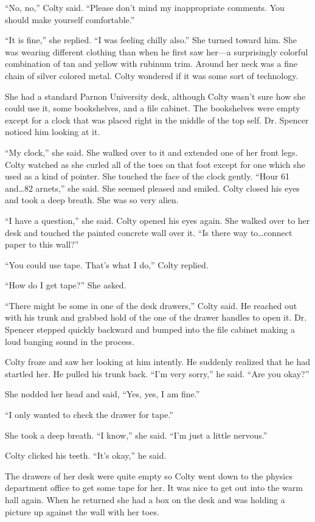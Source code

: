 ``No, no,'' Colty said. ``Please don't mind my inappropriate comments. You should make yourself
comfortable.''

``It is fine,'' she replied. ``I was feeling chilly also.'' She turned toward him. She was
wearing different clothing than when he first saw her---a surprisingly colorful combination of
tan and yellow with rubinum trim. Around her neck was a fine chain of silver colored metal.
Colty wondered if it was some sort of technology.

She had a standard Parnon University desk, although Colty wasn't sure how she could use it, some
bookshelves, and a file cabinet. The bookshelves were empty except for a clock that was placed
right in the middle of the top self. Dr. Spencer noticed him looking at it.

``My clock,'' she said. She walked over to it and extended one of her front legs. Colty watched
as she curled all of the toes on that foot except for one which she used as a kind of pointer.
She touched the face of the clock gently. ``Hour 61 and\ldots 82 arnets,'' she said. She seemed
pleased and smiled. Colty closed his eyes and took a deep breath. She was so very alien.

``I have a question,'' she said. Colty opened his eyes again. She walked over to her desk and
touched the painted concrete wall over it. ``Is there way to\ldots connect paper to this wall?''

``You could use tape. That's what I do,'' Colty replied.

``How do I get tape?'' She asked.

``There might be some in one of the desk drawers,'' Colty said. He reached out with his trunk
and grabbed hold of the one of the drawer handles to open it. Dr. Spencer stepped quickly
backward and bumped into the file cabinet making a loud banging sound in the process.

Colty froze and saw her looking at him intently. He suddenly realized that he had startled her.
He pulled his trunk back. ``I'm very sorry,'' he said. ``Are you okay?''

She nodded her head and said, ``Yes, yes, I am fine.''

``I only wanted to check the drawer for tape.''

She took a deep breath. ``I know,'' she said. ``I'm just a little nervous.''

Colty clicked his teeth. ``It's okay,'' he said.

The drawers of her desk were quite empty so Colty went down to the physics department office to
get some tape for her. It was nice to get out into the warm hall again. When he returned she had
a box on the desk and was holding a picture up against the wall with her toes.

